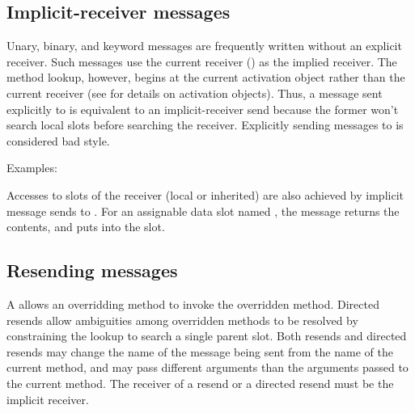 \documentclass[letterpaper,10pt,english]{sphinxmanual}
\begin{document}

\subsection{Implicit-receiver messages}
\label{\detokenize{langref:implicit-receiver-messages}}\label{\detokenize{langref:index-51}}\label{\detokenize{langref:pp-implicit-receiver}}
Unary, binary, and keyword messages are frequently written without an explicit receiver. Such messages use the current receiver () as the implied receiver. The method lookup, however, begins at the current activation object rather than the current receiver (see {\hyperref[\detokenize{langref:pp-methods}]{}} for details on activation objects). Thus, a message sent explicitly to  is  equivalent to an implicit-receiver send because the former won’t search local slots before searching the receiver. Explicitly sending messages to  is considered bad style.

Examples:

\begin{sphinxVerbatim}[commandchars=\\\{\}]
          
                 
              
             
\end{sphinxVerbatim}

Accesses to slots of the receiver (local or inherited) are also achieved by implicit message sends to . For an assignable data slot named , the message  returns the contents, and  puts  into the slot.


\subsection{Resending messages}
\label{\detokenize{langref:index-53}}\label{\detokenize{langref:resending-messages}}
A  allows an overridding method to invoke the overridden method. Directed resends allow ambiguities among overridden methods to be resolved by constraining the lookup to search a single parent slot. Both resends and directed resends may change the name of the message being sent from the name of the current method, and may pass different arguments than the arguments passed to the current method. The receiver of a resend or a directed resend must be the implicit receiver.
\end{document}
